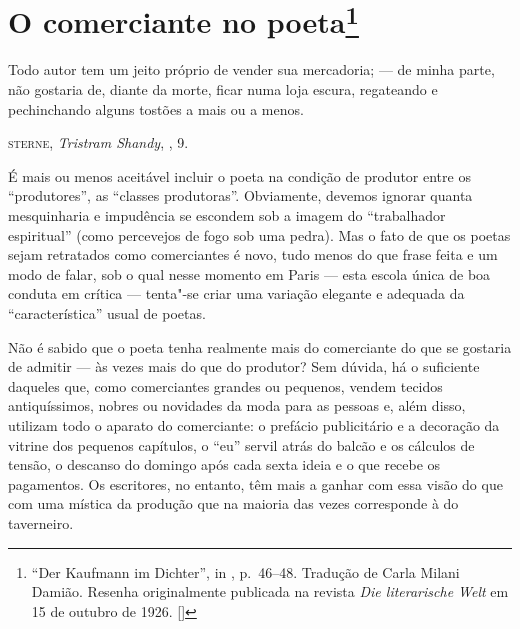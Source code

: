 \chapter{O comerciante no poeta\footnote[*]{``Der Kaufmann im Dichter'', in  , p.~46--48. Tradução de Carla Milani Damião. Resenha originalmente publicada na revista \emph{Die literarische Welt} em 15 de outubro de 1926. []}}

\epigraph{Todo autor tem um jeito próprio de vender sua mercadoria; --- de minha
parte, não gostaria de, diante da morte, ficar numa loja escura,
regateando e pechinchando alguns tostões a mais ou a menos.}{\textsc{sterne}, \emph{Tristram Shandy}, , 9.\footnotemark}


\noindent{}É mais ou menos aceitável incluir o poeta na condição de produtor entre
os ``produtores'', as ``classes produtoras''. Obviamente, devemos ignorar
quanta mesquinharia e impudência se escondem sob a imagem do
``trabalhador espiritual'' (como percevejos de fogo sob uma pedra). Mas o
fato de que os poetas sejam retratados como comerciantes é novo, tudo
menos do que frase feita e um modo de falar, sob o qual nesse momento em
Paris --- esta escola única de boa conduta em crítica --- tenta"-se criar
uma variação elegante e adequada da ``característica'' usual de poetas.

Não é sabido que o poeta tenha realmente mais do comerciante do que se
gostaria de admitir --- às vezes mais do que do produtor? Sem dúvida, há o
suficiente daqueles que, como comerciantes grandes ou pequenos, vendem
tecidos antiquíssimos, nobres ou novidades da moda para as pessoas e,
além disso, utilizam todo o aparato do comerciante: o prefácio
publicitário e a decoração da vitrine dos pequenos capítulos, o ``eu''
servil atrás do balcão e os cálculos de tensão, o descanso do domingo
após cada sexta ideia e o que recebe os pagamentos. Os escritores, no
entanto, têm mais a ganhar com essa visão do que com uma mística da
produção que na maioria das vezes corresponde à do taverneiro.

